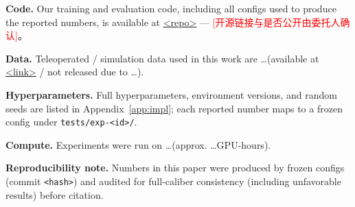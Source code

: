 
\textbf{Code.} Our training and evaluation code, including all configs used to
produce the reported numbers, is available at \url{<repo>} — \textcolor{red}{[开源链接与是否公开由委托人确认]}。

\textbf{Data.} Teleoperated / simulation data used in this work are
\ldots (available at \url{<link>} / not released due to \ldots). %

\textbf{Hyperparameters.} Full hyperparameters, environment versions, and random
seeds are listed in Appendix~\ref{app:impl}; each reported number maps to a
frozen config under \texttt{tests/exp-<id>/}.

\textbf{Compute.} Experiments were run on \ldots (approx. \ldots GPU-hours).

\textbf{Reproducibility note.} Numbers in this paper were produced by frozen
configs (commit \texttt{<hash>}) and audited for full-caliber consistency
(including unfavorable results) before citation.
